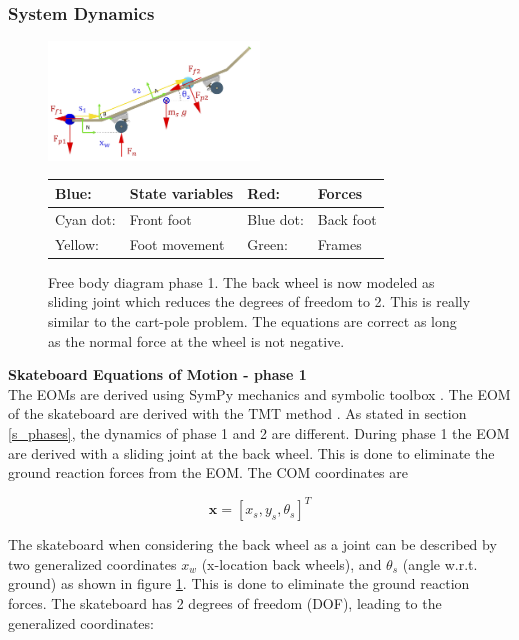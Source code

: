 \documentclass[default,iicol]{sn-jnl}
\theoremstyle{thmstyleone}%
\theoremstyle{thmstyletwo}%
\theoremstyle{thmstylethree}%
\begin{document}
\subsubsection{System Dynamics}\label{s_systemdynamics}
\begin{figure}
    \centering
    \includegraphics[width = 0.5\textwidth]{figure/FBD_phase1.png}
    \footnotesize\begin{tabular}{|l l|l l|} \hline
    \color{blue}Blue: & State variables &\color{red} Red: & Forces \\ \hline
    \color{cyan}Cyan dot: & Front foot & \color{blue}Blue dot: & Back foot \\ \hline
    \color{yellow}Yellow: & Foot movement & \color{green}Green: & Frames \\ \hline
    \end{tabular}
    \caption[Free body diagram phase 1]{Free body diagram phase 1. The back wheel is now modeled as sliding joint which reduces the degrees of freedom to 2. This is really  similar to the cart-pole problem. The equations are correct as long as the normal force at the wheel is not negative.}
    \label{f_FBDphas1}
\end{figure}

\noindent \; \textbf{Skateboard Equations of Motion - phase 1}\\
The EOMs are derived using SymPy mechanics and symbolic toolbox \cite{meurer_sympy_2017}. The EOM of the skateboard are derived with the TMT method \cite{vallery_heike_advanced_2018}. As stated in section \ref{s_phases}, the dynamics of phase 1 and 2 are different. During phase 1 the EOM are derived with a sliding joint at the back wheel. This is done to eliminate the ground reaction forces from the EOM. The COM coordinates are

\begin{equation}
    \mathbf{x} = [x_s, y_s, \theta_s]^T
\end{equation}

The skateboard when considering the back wheel as a joint can be described by two generalized coordinates $x_w$ (x-location back wheels), and $\theta_s$ (angle w.r.t. ground) as shown in figure \ref{f_FBDphas1}. This is done to eliminate the ground reaction forces. The skateboard has 2 degrees of freedom (DOF), leading to the generalized coordinates:
\end{document}

